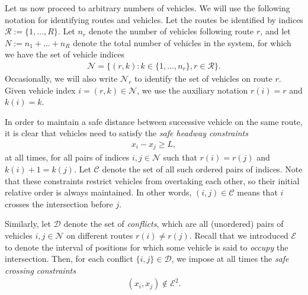 \documentclass[a4paper]{report}
\theoremstyle{definition}
\theoremstyle{plain}
\begin{document}
Let us now proceed to arbitrary numbers of vehicles. We will use the following
notation for identifying routes and vehicles.
%
Let the routes be identified by indices $\mathcal{R} := \{1, \dots, R\}$. Let
$n_{r}$ denote the number of vehicles following route $r$, and let
$N := n_1 + \dots + n_R$ denote the total number of vehicles in the system, for
which we have the set of vehicle indices
\begin{align}
  \mathcal{N} = \{ (r, k) : k \in \{1, \dots, n_{r}\}, r \in \mathcal{R}\} .
\end{align}
Occasionally, we will also write $\mathcal{N}_{r}$ to identify the set of
vehicles on route $r$. Given vehicle index $i = (r, k) \in \mathcal{N}$, we use
the auxiliary notation $r(i) = r$ and $k(i) = k$.

In order to maintain a safe distance between successive vehicle on the same
route, it is clear that vehicles need to satisfy the \textit{safe headway constraints}
\begin{align}
  \label{eq:follow_constraints}
  x_{i} - x_{j} \geq L ,
\end{align}
at all times, for all pairs of indices $i, j \in \mathcal{N}$ such that
$r(i) = r(j)$ and $k(i) + 1 = k(j)$. Let $\mathcal{C}$ denote the set of all
such ordered pairs of indices. Note that these constraints restrict vehicles
from overtaking each other, so their initial relative order is always
maintained. In other words, $(i,j) \in \mathcal{C}$ means that $i$ crosses the
intersection before $j$.

Similarly, let $\mathcal{D}$ denote the set of \emph{conflicts}, which are all
(unordered) pairs of vehicles $i, j \in \mathcal{N}$ on different routes
$r(i) \neq r(j)$.
%
Recall that we introduced $\mathcal{E}$ to denote the interval of positions for
which some vehicle is said to \emph{occupy} the intersection. Then, for each conflict
$\{i,j\} \in \mathcal{D}$, we impose at all times the \emph{safe crossing constraints}
\begin{align}
  \label{eq:2}
  (x_{i}, x_{j}) \notin \mathcal{E}^{2} .
\end{align}
\end{document}
